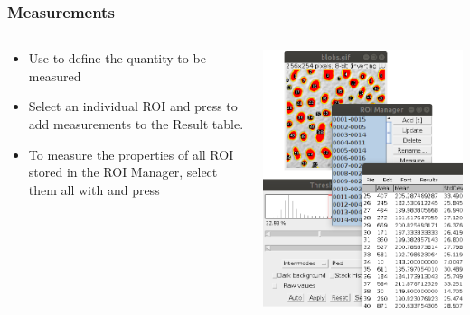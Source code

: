 \documentclass[ignorenonframetext,aspectratio=169,10pt,xcolor=table]{beamer}
\begin{document}
\begin{frame} \frametitle{Measurements}
  \begin{columns}
    \begin{column}{0.65\textwidth}
      \begin{itemize} \setlength\itemsep{2em}
      \item Use  to define the
        quantity to be measured
      \item Select an individual ROI and press  to add
        measurements to the Result table.
      \item To measure the properties of all ROI stored in the ROI
        Manager, select them all with  and press 
      \end{itemize}
    \end{column}
    \begin{column}{0.35\textwidth}
      \includegraphics[width=\textwidth]{measure}
    \end{column}
  \end{columns}
\end{frame}
\end{document}
